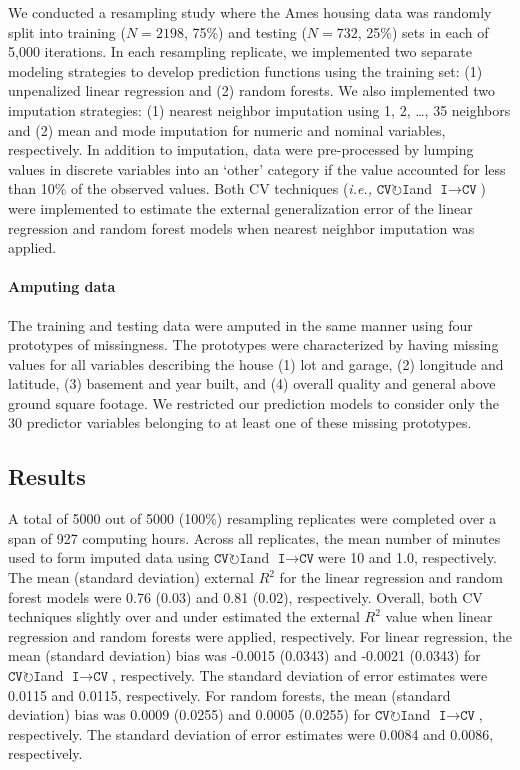 \documentclass[AMA,STIX1COL,doublespace]{WileyNJD-v2}
\begin{document}
We conducted a resampling study where the Ames housing data was randomly
split into training (\(N = 2198\), 75\%) and testing (\(N = 732\), 25\%)
sets in each of 5,000 iterations. In each resampling replicate, we
implemented two separate modeling strategies to develop prediction
functions using the training set: (1) unpenalized linear regression and
(2) random forests. We also implemented two imputation strategies: (1)
nearest neighbor imputation using 1, 2, \ldots, 35 neighbors and (2)
mean and mode imputation for numeric and nominal variables,
respectively. In addition to imputation, data were pre-processed by
lumping values in discrete variables into an `other' category if the
value accounted for less than 10\% of the observed values. Both CV
techniques
(\textit{i.e., }$\texttt{CV}\!\circlearrowright\!\texttt{I}$\space and
$\texttt{I}\!\!\rightarrow\!\texttt{CV}$) were implemented to estimate
the external generalization error of the linear regression and random
forest models when nearest neighbor imputation was applied.

\paragraph{Amputing data}

The training and testing data were amputed in the same manner using four
prototypes of missingness. The prototypes were characterized by having
missing values for all variables describing the house (1) lot and
garage, (2) longitude and latitude, (3) basement and year built, and (4)
overall quality and general above ground square footage. We restricted
our prediction models to consider only the 30 predictor variables
belonging to at least one of these missing prototypes.

\subsection{Results}

A total of 5000 out of 5000 (100\%) resampling replicates were completed
over a span of 927 computing hours. Across all replicates, the mean
number of minutes used to form imputed data using
$\texttt{CV}\!\circlearrowright\!\texttt{I}$\space and
$\texttt{I}\!\!\rightarrow\!\texttt{CV}$\space were 10 and 1.0,
respectively. The mean (standard deviation) external \(R^2\) for the
linear regression and random forest models were 0.76 (0.03) and 0.81
(0.02), respectively. Overall, both CV techniques slightly over and
under estimated the external \(R^2\) value when linear regression and
random forests were applied, respectively. For linear regression, the
mean (standard deviation) bias was -0.0015 (0.0343) and -0.0021 (0.0343)
for $\texttt{CV}\!\circlearrowright\!\texttt{I}$\space and
$\texttt{I}\!\!\rightarrow\!\texttt{CV}$, respectively. The standard
deviation of error estimates were 0.0115 and 0.0115, respectively. For
random forests, the mean (standard deviation) bias was 0.0009 (0.0255)
and 0.0005 (0.0255) for
$\texttt{CV}\!\circlearrowright\!\texttt{I}$\space and
$\texttt{I}\!\!\rightarrow\!\texttt{CV}$, respectively. The standard
deviation of error estimates were 0.0084 and 0.0086, respectively.
\end{document}
